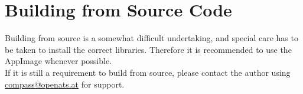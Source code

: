\section{Building from Source Code}

Building from source is a somewhat difficult undertaking, and special care has to be taken to install the correct libraries. Therefore it is recommended to use the AppImage whenever possible. \\

If it is still a requirement to build from source, please contact the author using \href{mailto:compass@openats.at}{compass@openats.at} for support.





